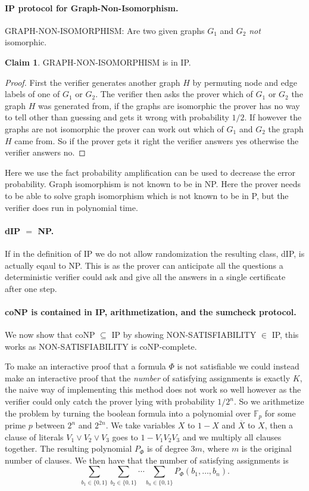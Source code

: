 \documentclass[11pt,a4paper]{article}
\theoremstyle{definition}
\newtheorem{claim}{Claim}
\newcommand{\FF}{\mathbb{F}}
\begin{document}
\paragraph{IP protocol for Graph-Non-Isomorphism.}
GRAPH-NON-ISOMORPHISM: Are two given graphs $G_1$ and $G_2$ \emph{not} isomorphic.

\begin{claim}
GRAPH-NON-ISOMORPHISM is in IP.
\end{claim}
\begin{proof}
First the verifier generates another graph $H$ by permuting node and edge labels of one of $G_1$ or $G_2$.
The verifier then asks the prover which of $G_1$ or $G_2$ the graph $H$ was generated from, if the graphs are isomorphic the prover has no way to tell other than guessing and gets it wrong with probability $1/2$.
If however the graphs are not isomorphic the prover can work out which of $G_1$ and $G_2$ the graph $H$ came from.
So if the prover gets it right the verifier answers yes otherwise the verifier answers no.
\end{proof}
Here we use the fact probability amplification can be used to decrease the error probability.
Graph isomorphism is not known to be in NP.
Here the prover needs to be able to solve graph isomorphism which is not known to be in P, but the verifier does run in polynomial time.

\paragraph{dIP $=$ NP.}
If in the definition of IP we do not allow randomization the resulting class, dIP, is actually eqaul to NP.
This is as the prover can anticipate all the questions a deterministic verifier could ask and give all the answers in a single certificate after one step.

\paragraph{coNP is contained in IP, arithmetization, and the sumcheck protocol.}
We now show that coNP $\subseteq$ IP by showing NON-SATISFIABILITY $\in$ IP, this works as NON-SATISFIABILITY is coNP-complete.

To make an interactive proof that a formula $\Phi$ is not satisfiable we could instead make an interactive proof that the \emph{number} of satisfying assignments is exactly $K$, the naive way of implementing this method does not work so well however as the verifier could only catch the prover lying with probability $1/2^n$.
So we arithmetize the problem by turning the boolean formula into a polynomial over $\FF_p$ for some prime $p$ between $2^n$ and $2^{2n}$.
We take variables $X$ to $1-X$ and $\overline{X}$ to $X$, then a clause of literals $V_1 \vee V_2 \vee V_3$ goes to $1 - V_1 V_2 V_3$ and we multiply all clauses together.
The resulting polynomial $P_\Phi$ is of degree $3m$, where $m$ is the original number of clauses.
We then have that the number of satisfying assignments is
\[
\sum_{b_1\in\{0,1\}} \sum_{b_2\in\{0,1\}} \cdots \sum_{b_n\in\{0,1\}} P_{\Phi}(b_1,\ldots,b_n).
\]
\end{document}
